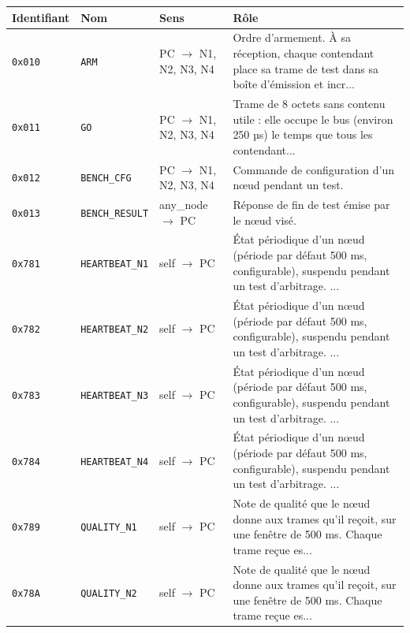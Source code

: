 
\begin{table}[H]
\centering\small
\begin{tabular}{llll}
\toprule
\textbf{Identifiant} & \textbf{Nom} & \textbf{Sens} & \textbf{Rôle} \\
\midrule
\texttt{0x010} & \texttt{ARM} & PC $\rightarrow$ N1, N2, N3, N4 & Ordre d'armement. À sa réception, chaque contendant place sa trame de test dans sa boîte d'émission et incr... \\
\texttt{0x011} & \texttt{GO} & PC $\rightarrow$ N1, N2, N3, N4 & Trame de 8 octets sans contenu utile : elle occupe le bus (environ 250 µs) le temps que tous les contendant... \\
\texttt{0x012} & \texttt{BENCH\_CFG} & PC $\rightarrow$ N1, N2, N3, N4 & Commande de configuration d'un nœud pendant un test. \\
\texttt{0x013} & \texttt{BENCH\_RESULT} & any\_node $\rightarrow$ PC & Réponse de fin de test émise par le nœud visé. \\
\texttt{0x781} & \texttt{HEARTBEAT\_N1} & self $\rightarrow$ PC & État périodique d'un nœud (période par défaut 500 ms, configurable), suspendu pendant un test d'arbitrage. ... \\
\texttt{0x782} & \texttt{HEARTBEAT\_N2} & self $\rightarrow$ PC & État périodique d'un nœud (période par défaut 500 ms, configurable), suspendu pendant un test d'arbitrage. ... \\
\texttt{0x783} & \texttt{HEARTBEAT\_N3} & self $\rightarrow$ PC & État périodique d'un nœud (période par défaut 500 ms, configurable), suspendu pendant un test d'arbitrage. ... \\
\texttt{0x784} & \texttt{HEARTBEAT\_N4} & self $\rightarrow$ PC & État périodique d'un nœud (période par défaut 500 ms, configurable), suspendu pendant un test d'arbitrage. ... \\
\texttt{0x789} & \texttt{QUALITY\_N1} & self $\rightarrow$ PC & Note de qualité que le nœud donne aux trames qu'il reçoit, sur une fenêtre de 500 ms. Chaque trame reçue es... \\
\texttt{0x78A} & \texttt{QUALITY\_N2} & self $\rightarrow$ PC & Note de qualité que le nœud donne aux trames qu'il reçoit, sur une fenêtre de 500 ms. Chaque trame reçue es... \\

\end{tabular}
\end{table}
